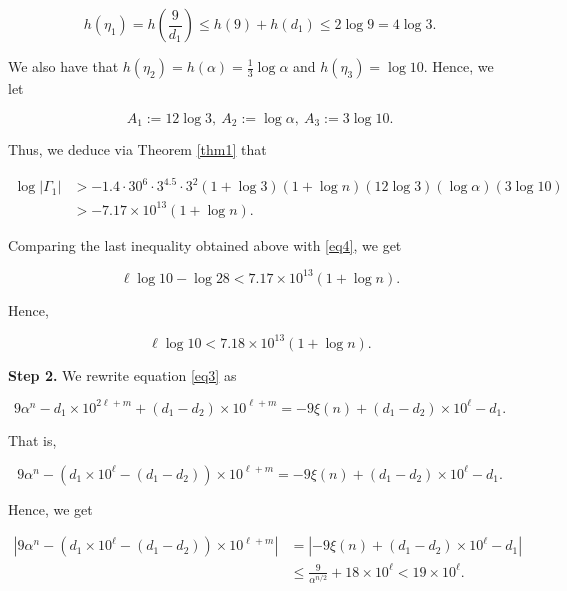 \documentclass[10pt,a4paper]{article}
\begin{document}
\begin{equation*}
h(\eta_1) = h \left( \frac{9}{d_1} \right) \leq h(9) + h(d_1) \leq 2\log 9=4\log 3.
\end{equation*}

\noindent We also have that $h(\eta_2) = h(\alpha) = \frac{1}{3}\log \alpha$ and $h(\eta_3) = \log 10$. Hence, we let

\begin{equation*}
A_1 := 12\log 3, \ A_2 := \log \alpha, \ A_3 := 3 \log 10.
\end{equation*}

\noindent Thus, we deduce via Theorem \ref{thm1} that

\begin{align*}
\log |\Gamma_1| & > -1.4 \cdot 30^6 \cdot  3^{4.5} \cdot  3^2 (1 + \log 3)(1 + \log n)(12\log 3)(\log \alpha)(3 \log 10) \\&> -7.17\times 10^{13}(1 + \log n).
\end{align*}

\noindent Comparing the last inequality obtained above with \eqref{eq4}, we get

\begin{equation*}
\ell \log 10 - \log 28 < 7.17 \times 10^{13}(1 + \log n).
\end{equation*}

\noindent Hence,

\begin{equation}\label{eq5}
\ell \log 10 <  7.18 \times 10^{13}(1 + \log n).
\end{equation}

\noindent \textbf{Step 2.} We rewrite equation \eqref{eq3} as

\begin{equation*}
9 \alpha^n  - d_1 \times 10^{2\ell + m} + (d_1-d_2)\times 10^{\ell+m} = -9\xi(n)  + (d_1-d_2)\times 10^\ell - d_1.
\end{equation*}

\noindent That is, 

\begin{equation*}
9 \alpha^n  - (d_1 \times 10^\ell - (d_1-d_2))\times 10^{\ell+m} = -9\xi(n)  + (d_1-d_2)\times 10^\ell - d_1.
\end{equation*}

\noindent Hence, we get

\begin{align*}
\left|9 \alpha^n  - (d_1 \times 10^\ell - (d_1-d_2))\times 10^{\ell+m}\right| & = \left|-9\xi(n)  + (d_1-d_2)\times 10^\ell - d_1\right|\\
& \leq \frac{9}{\alpha^{n/2}} + 18 \times 10^\ell < 19 \times 10^\ell .
\end{align*}
\end{document}
